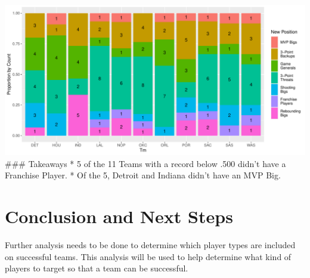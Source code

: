 \documentclass[
]{article}
\begin{document}
\includegraphics{Reclassifying-NBA-Player-Postions-Pt.-3---Clustering-Analysis-Results_files/figure-latex/unnamed-chunk-16-1.pdf}
\#\#\# Takeaways * 5 of the 11 Teams with a record below .500 didn't
have a Franchise Player. * Of the 5, Detroit and Indiana didn't have an
MVP Big.

\hypertarget{conclusion-and-next-steps}{%
\section{Conclusion and Next Steps}\label{conclusion-and-next-steps}}

Further analysis needs to be done to determine which player types are
included on successful teams. This analysis will be used to help
determine what kind of players to target so that a team can be
successful.
\end{document}

